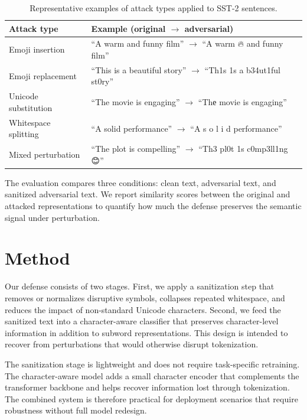 \documentclass[11pt]{article}
\begin{document}
\begin{table}[h]
\centering
\small
\begin{tabular}{p{} p{}}
\toprule
Attack type & Example \newline (original $\rightarrow$ adversarial) \\ 
\midrule
Emoji insertion & ``A warm and funny film'' $\rightarrow$ ``A warm 🔥 and funny film'' \\ 
Emoji replacement & ``This is a beautiful story'' $\rightarrow$ ``Th1s 1s a b34ut1ful st0ry'' \\ 
Unicode substitution & ``The movie is engaging'' $\rightarrow$ ``Thе movie is engaging'' \\ 
Whitespace splitting & ``A solid performance'' $\rightarrow$ ``A   s o l i d   performance'' \\ 
Mixed perturbation & ``The plot is compelling'' $\rightarrow$ ``Th3 pl0t 1s c0mp3ll1ng 😊'' \\ 
\bottomrule
\end{tabular}
\caption{Representative examples of attack types applied to SST-2 sentences.}
\end{table}

The evaluation compares three conditions: clean text, adversarial text, and sanitized adversarial text. We report similarity scores between the original and attacked representations to quantify how much the defense preserves the semantic signal under perturbation.

\section{Method}
Our defense consists of two stages. First, we apply a sanitization step that removes or normalizes disruptive symbols, collapses repeated whitespace, and reduces the impact of non-standard Unicode characters. Second, we feed the sanitized text into a character-aware classifier that preserves character-level information in addition to subword representations. This design is intended to recover from perturbations that would otherwise disrupt tokenization.

The sanitization stage is lightweight and does not require task-specific retraining. The character-aware model adds a small character encoder that complements the transformer backbone and helps recover information lost through tokenization. The combined system is therefore practical for deployment scenarios that require robustness without full model redesign.
\end{document}
